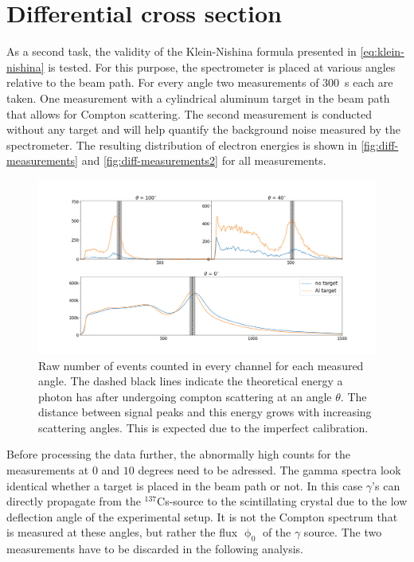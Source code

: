 
\section{Differential cross section}
\label{sec:differential-cross-section}

As a second task, the validity of the Klein-Nishina formula presented in
\autoref{eq:klein-nishina} is tested. For this purpose, the spectrometer is placed
at various angles relative to the beam path. For every angle two measurements of
\SI{300}{\second} each are taken. One measurement with a cylindrical aluminum target
in the beam path that allows for Compton scattering. The second measurement is
conducted without any target and will help quantify the background noise measured
by the spectrometer. The resulting distribution of electron energies is shown in
\autoref{fig:diff-measurements} and \autoref{fig:diff-measurements2} for all measurements.

\begin{figure}
  \includegraphics[width=1.0\textwidth]{./fig/differential measurements_part.png}
\caption{Raw number of events counted in every channel for each measured angle.
  The dashed black lines indicate the theoretical energy a photon has after
  undergoing compton scattering at an angle $\theta$. The distance between signal
  peaks and this energy grows with increasing scattering angles. This is expected
  due to the imperfect calibration.}\label{fig:diff-measurements}
\end{figure}

Before processing the data further, the abnormally high counts for the measurements
at $0$ and $10$ degrees need to be adressed. The gamma spectra look identical 
whether a target is placed in the beam path or not. In this case $\gamma$'s can 
directly propagate from the $^{137}$Cs-source to the scintillating crystal due to the
low deflection angle of the experimental setup. It is not the Compton spectrum that 
is measured at these angles, but rather the flux $\upphi_0$ of the $\gamma$ source. 
The two  measurements have to be discarded in the following analysis.

